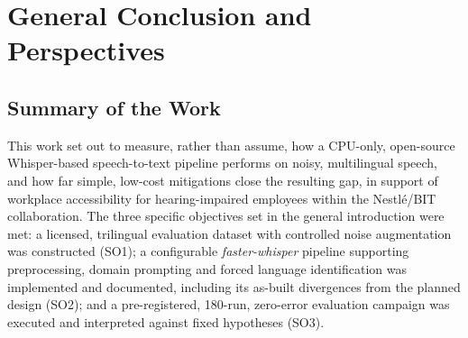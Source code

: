 \documentclass[12pt]{report}
\begin{document}
\chapter*{General Conclusion and Perspectives}
\thispagestyle{fancy}
\section*{Summary of the Work}
This work set out to measure, rather than assume, how a CPU-only, open-source Whisper-based speech-to-text pipeline performs on noisy, multilingual speech, and how far simple, low-cost mitigations close the resulting gap, in support of workplace accessibility for hearing-impaired employees within the Nestl\'e/BIT collaboration. The three specific objectives set in the general introduction were met: a licensed, trilingual evaluation dataset with controlled noise augmentation was constructed (SO1); a configurable \textit{faster-whisper} pipeline supporting preprocessing, domain prompting and forced language identification was implemented and documented, including its as-built divergences from the planned design (SO2); and a pre-registered, 180-run, zero-error evaluation campaign was executed and interpreted against fixed hypotheses (SO3).
\end{document}
